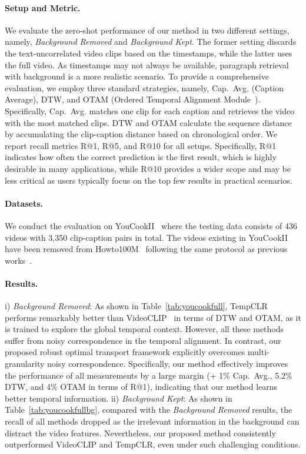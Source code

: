 \paragraph{Setup and Metric.} 
We evaluate the zero-shot performance of our method in two different settings, namely, \textit{Background Removed} and \textit{Background Kept}. 
The former setting discards the text-uncorrelated video clips based on the timestamps, while the latter uses the full video. As timestamps may not always be available, paragraph retrieval with background is a more realistic scenario.
To provide a comprehensive evaluation, we employ three standard strategies, namely,  \mbox{Cap. Avg.} (Caption Average), DTW, and OTAM (Ordered Temporal Alignment Module~\citep{otam}). Specifically, \mbox{Cap. Avg.} matches one clip for each caption and retrieves the video with the most matched clips. DTW and OTAM calculate the sequence distance by accumulating the clip-caption distance based on chronological order. We report recall metrics R@1, R@5, and R@10 for all setups.
Specifically, R@1 indicates how often the correct prediction is the first result, which is highly desirable in many applications, while R@10 provides a wider scope and may be less critical as users typically focus on the top few results in practical scenarios.

\paragraph{Datasets.} We conduct the evaluation on YouCookII~\citep{youcook} where the testing data consists of 436 videos with 3,350 clip-caption pairs in total. The videos existing in YouCookII have been removed from Howto100M~\citep{howto100m} following the same protocol as previous works~\citep{milnce,videoclip,tempclr}. 

 \paragraph{Results.} 
i) \textit{Background Removed}:
As shown in Table~\ref{tab:youcookfull}, TempCLR~\citep{tempclr} performs remarkably better than VideoCLIP~\citep{videoclip} in terms of DTW and OTAM, as it is trained to explore the global temporal context. However, all these methods suffer from noisy correspondence in the temporal alignment.
In contrast, our proposed robust optimal transport framework explicitly overcomes multi-granularity noisy correspondence. 
Specifically, our method effectively improves the performance of all measurements by a large margin (+ 1\% \mbox{Cap. Avg.}, 5.2\% DTW, and 4\% OTAM in terms of R@1), indicating that our method learns better temporal information.
ii) \textit{Background Kept}:
As shown in Table~\ref{tab:youcookfullbg}, compared with the \textit{Background Removed} results, the recall of all methods dropped as the irrelevant information in the background can distract the video features. Nevertheless, our proposed method consistently outperformed VideoCLIP and TempCLR, even under such challenging conditions.

